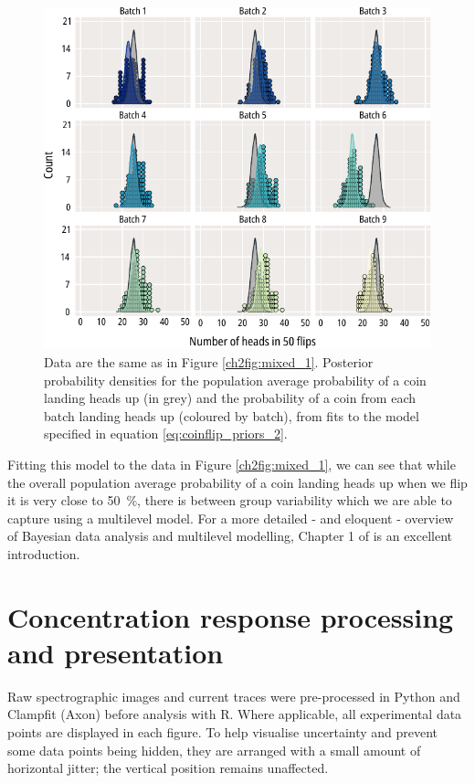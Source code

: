 \begin{figure}
	\centering
	\includegraphics[width=\textwidth]{coinflip_mixed_2.pdf}
	\caption[Multilevel modelling of coinflips - fitting the model]{
		Data are the same as in Figure \ref{ch2fig:mixed_1}.
		Posterior probability densities for the population average probability of a coin landing heads up (in grey) and the probability of a coin from each batch landing heads up (coloured by batch), from fits to the model specified in equation \ref{eq:coinflip_priors_2}.
	}\label{ch2fig:mixed_2}
\end{figure}

Fitting this model to the data in Figure \ref{ch2fig:mixed_1}, we can see that while the overall population average probability of a coin landing heads up when we flip it is very close to \SI{50}{\percent}, there is between group variability which we are able to capture using a multilevel model.
For a more detailed - and eloquent - overview of Bayesian data analysis and multilevel modelling, Chapter 1 of \textcite{mcelreath_statistical_2020} is an excellent introduction.

\section{Concentration response processing and presentation}
Raw spectrographic images and current traces were pre-processed in Python and Clampfit (Axon) before analysis with R.
Where applicable, all experimental data points are displayed in each figure.
To help visualise uncertainty and prevent some data points being hidden, they are arranged with a small amount of horizontal jitter; the vertical position remains unaffected.

